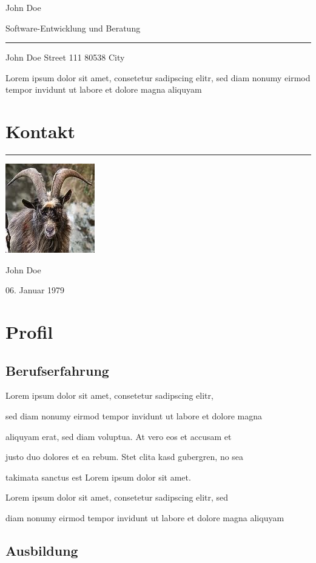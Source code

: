 \documentclass[11pt,a4paper,oneside,twocolumn=true]{report}
\newcommand{\HRule}{\rule{\linewidth}{0.2mm}}
\begin{document}
\setlength{\columnsep}{.25in}
\begin{multicols}{2}


{\LARGE John Doe}
\vspace{0.5cm}

{\Large Software-Entwicklung und Beratung}

\HRule

John Doe 
Street 111	
80538 City 	

Lorem ipsum dolor sit amet, 
consetetur sadipscing elitr, 
sed diam nonumy eirmod tempor 
invidunt ut labore et dolore magna aliquyam

\section{Kontakt}
\HRule


\includegraphics{foobar}

John Doe

06. Januar 1979



\section{Profil}
\subsection{Berufserfahrung}
  Lorem ipsum dolor sit amet, consetetur sadipscing elitr, 

sed diam nonumy eirmod tempor invidunt ut labore et dolore magna

 aliquyam erat, sed diam voluptua. At vero eos et accusam et 

justo duo dolores et ea rebum. Stet clita kasd gubergren, no sea

 takimata sanctus est Lorem ipsum dolor sit amet. 

Lorem ipsum dolor sit amet, consetetur sadipscing elitr, sed 

diam nonumy eirmod tempor invidunt ut labore et dolore magna aliquyam


	\subsection{Ausbildung}


\end{multicols}
\end{document}
